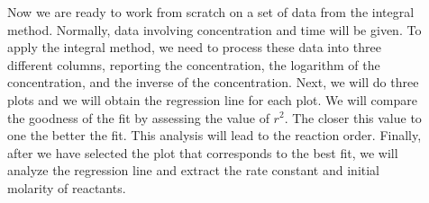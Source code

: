 \documentclass[main.tex]{subfiles}
\begin{document}
\begin{description}
\item[] 
Now we are ready to work from scratch on a set of data from the integral method. Normally, data involving concentration and time will be given. To apply the integral method, we need to process these data into three different columns, reporting the concentration, the logarithm of the concentration, and the inverse of the concentration. Next, we will do three plots and we will obtain the regression line for each plot. We will compare the goodness of the fit by assessing the value of $r^2$. The closer this value to one the better the fit. This analysis will lead to the reaction order. Finally, after we have selected the plot that corresponds to the best fit, we will analyze the regression line and extract the rate constant and initial molarity of reactants. 


\end{description}
\end{document}
